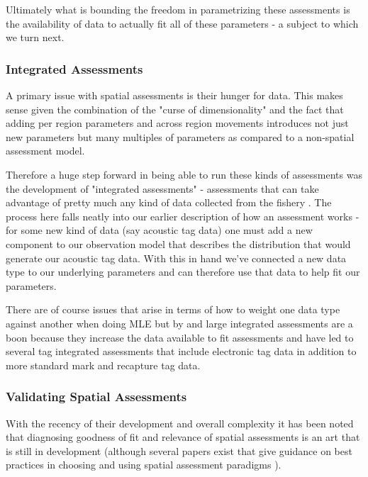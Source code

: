 \documentclass[11pt]{article}
\begin{document}
Ultimately what is bounding the freedom in parametrizing these assessments is the availability of data to actually fit all of these parameters \citep{goethel2023} - a subject to which we turn next.

\subsubsection{Integrated Assessments}

A primary issue with spatial assessments is their hunger for data. This makes sense given the combination of the "curse of dimensionality" and the fact that adding per region parameters and across region movements introduces not just new parameters but many multiples of parameters as compared to a non-spatial assessment model. 

Therefore a huge step forward in being able to run these kinds of assessments was the development of "integrated assessments" - assessments that can take advantage of pretty much any kind of data collected from the fishery \citep{sippel2014}. The process here falls neatly into our earlier description of how an assessment works - for some new kind of data (say acoustic tag data) one must add a new component to our observation model that describes the distribution that would generate our acoustic tag data. With this in hand we've connected a new data type to our underlying parameters and can therefore use that data to help fit our parameters. 

There are of course issues that arise in terms of how to weight one data type against another when doing MLE \citep{sippel2014} \citep{punt2019} but by and large integrated assessments are a boon because they increase the data available to fit assessments and have led to several tag integrated assessments that include electronic tag data in addition to more standard mark and recapture tag data. 

\subsubsection{Validating Spatial Assessments}

With the recency of their development and overall complexity it has been noted that diagnosing goodness of fit and relevance of spatial assessments is an art that is still in development (although several papers exist that give guidance on best practices in choosing and using spatial assessment paradigms \citep{goethel2023} \citep{punt2019}). 
\end{document}
